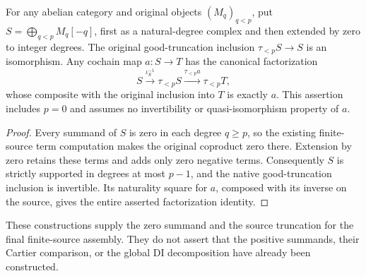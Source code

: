 \begin{lemma}
\label{lem:di-finite-source-good-truncation}
\leanok
For any abelian category and original objects $(M_q)_{q<p}$, put
$S=\bigoplus_{q<p}M_q[-q]$, first as a natural-degree complex and then
extended by zero to integer degrees. The original good-truncation
inclusion $\tau_{<p}S\to S$ is an isomorphism. Any cochain map $a:S\to T$
has the canonical factorization
\[
 S\xrightarrow{\iota_S^{-1}}\tau_{<p}S
   \xrightarrow{\tau_{<p}a}\tau_{<p}T,
\]
whose composite with the original inclusion into $T$ is exactly $a$.
This assertion includes $p=0$ and assumes no invertibility or
quasi-isomorphism property of $a$.
\end{lemma}
\begin{proof}
Every summand of $S$ is zero in each degree $q\ge p$, so the existing
finite-source term computation makes the original coproduct zero there.
Extension by zero retains these terms and adds only zero negative terms.
Consequently $S$ is strictly supported in degrees at most $p-1$, and the
native good-truncation inclusion is invertible. Its naturality square for
$a$, composed with its inverse on the source, gives the entire asserted
factorization identity.
\end{proof}

These constructions supply the zero summand and the source truncation for
the final finite-source assembly. They do not assert that the positive
summands, their Cartier comparison, or the global DI decomposition have
already been constructed.
